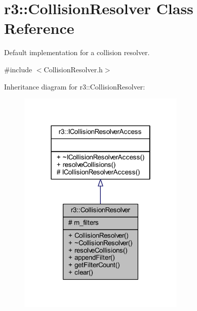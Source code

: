 \hypertarget{classr3_1_1_collision_resolver}{}\section{r3\+:\+:Collision\+Resolver Class Reference}
\label{classr3_1_1_collision_resolver}


Default implementation for a collision resolver.  




{\ttfamily \#include $<$Collision\+Resolver.\+h$>$}



Inheritance diagram for r3\+:\+:Collision\+Resolver\+:\nopagebreak
\begin{figure}[H]
\begin{center}
\leavevmode
\includegraphics[width=226pt]{classr3_1_1_collision_resolver__inherit__graph}
\end{center}
\end{figure}


